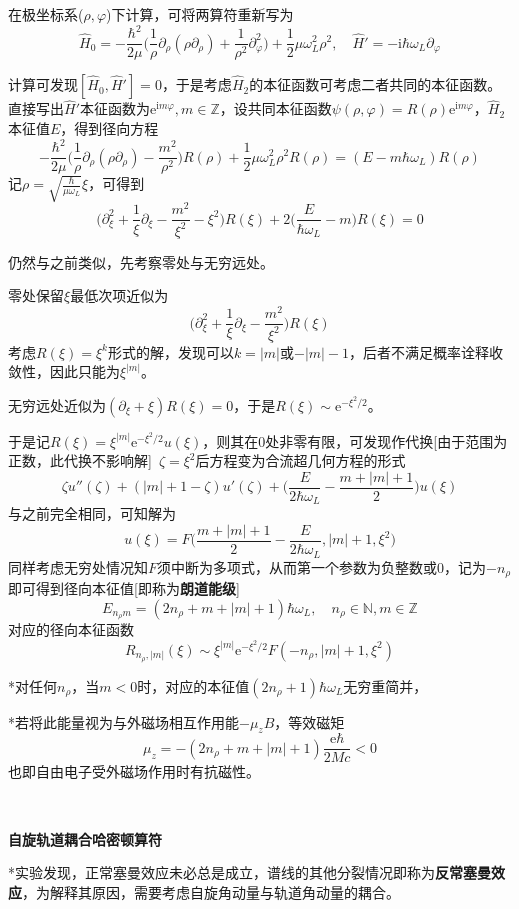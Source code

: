 \documentclass[a4paper,UTF8,fontset=windows]{ctexart}
\newcommand*{\ir}{\mathrm{i}}
\newcommand*{\er}{\mathrm{e}}
\begin{document}
在极坐标系($\rho,\varphi$)下计算，可将两算符重新写为
$$\hat{H}_0=-\frac{\hbar^2}{2\mu}\bigg(\frac{1}{\rho}\partial_\rho(\rho\partial_\rho)+\frac{1}{\rho^2}\partial_\varphi^2\bigg)+\frac{1}{2}\mu\omega_L^2\rho^2,\quad\hat{H}'=-\ir\hbar\omega_L\partial_\varphi$$

计算可发现$[\hat{H}_0,\hat{H}']=0$，于是考虑$\hat{H}_2$的本征函数可考虑二者共同的本征函数。直接写出$\hat{H}'$本征函数为$\er^{\ir m\varphi},m\in\mathbb{Z}$，设共同本征函数$\psi(\rho,\varphi)=R(\rho)\er^{\ir m\varphi}$，$\hat{H}_2$本征值$E$，得到径向方程
$$-\frac{\hbar^2}{2\mu}\bigg(\frac{1}{\rho}\partial_\rho(\rho\partial_\rho)-\frac{m^2}{\rho^2}\bigg)R(\rho)+\frac{1}{2}\mu\omega_L^2\rho^2R(\rho)=(E-m\hbar\omega_L)R(\rho)$$
记$\rho=\sqrt{\frac{\hbar}{\mu\omega_L}}\xi$，可得到
$$\bigg(\partial^2_\xi+\frac{1}{\xi}\partial_\xi-\frac{m^2}{\xi^2}-\xi^2\bigg)R(\xi)+2\bigg(\frac{E}{\hbar\omega_L}-m\bigg)R(\xi)=0$$

仍然与之前类似，先考察零处与无穷远处。

零处保留$\xi$最低次项近似为
$$\bigg(\partial^2_\xi+\frac{1}{\xi}\partial_\xi-\frac{m^2}{\xi^2}\bigg)R(\xi)$$
考虑$R(\xi)=\xi^k$形式的解，发现可以$k=|m|$或$-|m|-1$，后者不满足概率诠释收敛性，因此只能为$\xi^{|m|}$。

无穷远处近似为$(\partial_\xi+\xi)R(\xi)=0$，于是$R(\xi)\sim\er^{-\xi^2/2}$。

于是记$R(\xi)=\xi^{|m|}\er^{-\xi^2/2}u(\xi)$，则其在0处非零有限，可发现作代换[由于范围为正数，此代换不影响解]\ $\zeta=\xi^2$后方程变为合流超几何方程的形式
$$\zeta u''(\zeta)+(|m|+1-\zeta)u'(\zeta)+\bigg(\frac{E}{2\hbar\omega_L}-\frac{m+|m|+1}{2}\bigg)u(\xi)$$
与之前完全相同，可知解为
$$u(\xi)=F\bigg(\frac{m+|m|+1}{2}-\frac{E}{2\hbar\omega_L},|m|+1,\xi^2\bigg)$$
同样考虑无穷处情况知$F$须中断为多项式，从而第一个参数为负整数或0，记为$-n_\rho$即可得到径向本征值[即称为\textbf{朗道能级}]
$$E_{n_\rho m}=(2n_\rho+m+|m|+1)\hbar\omega_L,\quad n_\rho\in\mathbb{N},m\in\mathbb{Z}$$
对应的径向本征函数
$$R_{n_\rho,|m|}(\xi)\sim\xi^{|m|}\er^{-\xi^2/2}F(-n_\rho,|m|+1,\xi^2)$$

*对任何$n_\rho$，当$m<0$时，对应的本征值$(2n_\rho+1)\hbar\omega_L$无穷重简并，

*若将此能量视为与外磁场相互作用能$-\mu_zB$，等效磁矩
$$\mu_z=-(2n_\rho+m+|m|+1)\frac{\er\hbar}{2Mc}<0$$
也即自由电子受外磁场作用时有抗磁性。

\

\textbf{自旋轨道耦合哈密顿算符}

*实验发现，正常塞曼效应未必总是成立，谱线的其他分裂情况即称为\textbf{反常塞曼效应}，为解释其原因，需要考虑自旋角动量与轨道角动量的耦合。
\end{document}
